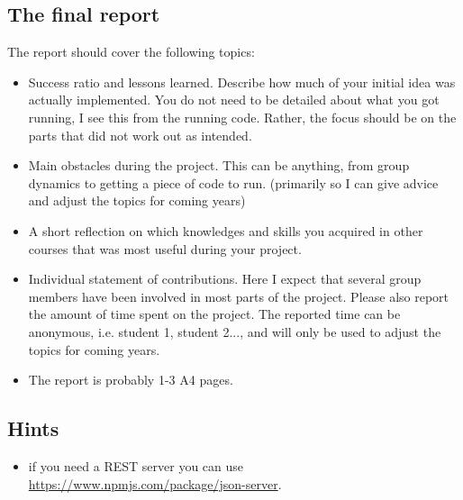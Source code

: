 \documentclass[fleqn, article, a4paper]{memoir}
\begin{document}
\subsection*{The final report}
\noindent The report should cover the following topics:
\begin{itemize}
\item Success ratio and lessons learned. Describe how much of your initial idea was actually implemented. You do not need to be detailed about what you got running, I see this from the running code. Rather, the focus should be on the parts that did not work out as intended.
\item Main obstacles during the project. This can be anything, from group dynamics to getting a piece of code to run. (primarily so I can give advice and adjust the topics for coming years)
\item A short reflection on which knowledges and skills you acquired in other courses that was most useful during your project.
\item Individual statement of contributions. Here I expect that several group members have been involved in most parts of the project. Please also report the amount of time spent on the project. The reported time can be anonymous, i.e. student 1, student 2..., and will only be used to adjust the topics for coming years.
\item The report is probably 1-3 A4 pages.
\end{itemize}

\subsection*{Hints}
\begin{itemize}
\item if you need a REST server you can use \url{https://www.npmjs.com/package/json-server}.
\end{itemize}

\end{document}
